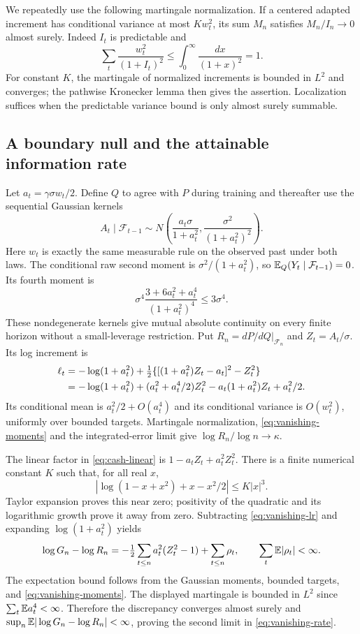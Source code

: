 We repeatedly use the following martingale normalization. If a centered
adapted increment has conditional variance at most $K w_t^2$, its sum
$M_n$ satisfies $M_n/I_n\to0$ almost surely. Indeed $I_t$ is predictable and
\[
 \sum_t\frac{w_t^2}{(1+I_t)^2}
 \le\int_0^\infty\frac{dx}{(1+x)^2}=1.
\]
For constant $K$, the martingale of normalized increments is bounded in
$L^2$ and converges; the pathwise Kronecker
lemma then gives the assertion. Localization suffices when the predictable
variance bound is only almost surely summable.

\subsection{A boundary null and the attainable information rate}
Let $a_t=\gamma\sigma w_t/2$. Define $Q$ to agree with $P$ during training
and thereafter use the sequential Gaussian kernels
\begin{equation}
 A_t\mid\mathcal F_{t-1}\sim
 N\!\left(\frac{a_t\sigma}{1+a_t^2},
           \frac{\sigma^2}{(1+a_t^2)^2}\right).
 \label{eq:vanishing-null}
\end{equation}
Here $w_t$ is exactly the same measurable rule on the observed past under
both laws. The conditional raw second moment is $\sigma^2/(1+a_t^2)$,
so $\mathbb E_Q(Y_t\mid\mathcal F_{t-1})=0$. Its fourth moment is
\[
 \sigma^4\frac{3+6a_t^2+a_t^4}{(1+a_t^2)^4}\le3\sigma^4.
\]
These nondegenerate kernels give mutual absolute continuity on every finite
horizon without a small-leverage restriction. Put $R_n=dP/dQ|_{\mathcal F_n}$
and $Z_t=A_t/\sigma$. Its log increment is
\begin{align}
 \ell_t&=-\log(1+a_t^2)
  +\tfrac12\{[(1+a_t^2)Z_t-a_t]^2-Z_t^2\}\notag\\
 &=-\log(1+a_t^2)+(a_t^2+a_t^4/2)Z_t^2
          -a_t(1+a_t^2)Z_t+a_t^2/2.
 \label{eq:vanishing-lr}
\end{align}
Its conditional mean is $a_t^2/2+O(a_t^4)$ and its conditional variance is
$O(w_t^2)$, uniformly over bounded targets. Martingale normalization,
\eqref{eq:vanishing-moments} and the integrated-error limit give
$\log R_n/\log n\to\kappa$.

The linear factor in \eqref{eq:cash-linear} is $1-a_tZ_t+a_t^2Z_t^2$.
There is a finite numerical constant $K$ such that, for all real $x$,
\[
 |\log(1-x+x^2)+x-x^2/2|\le K|x|^3.
\]
Taylor expansion proves this near zero; positivity of the quadratic and its
logarithmic growth prove it away from zero. Subtracting
\eqref{eq:vanishing-lr} and expanding $\log(1+a_t^2)$ yields
\begin{equation}
 \log G_n-\log R_n
   =-\tfrac12\sum_{t\le n}a_t^2(Z_t^2-1)+\sum_{t\le n}\rho_t,
 \qquad \sum_t\mathbb E|\rho_t|<\infty.
 \label{eq:vanishing-remainder}
\end{equation}
The expectation bound follows from the Gaussian moments, bounded targets,
and \eqref{eq:vanishing-moments}. The displayed martingale is bounded in
$L^2$ since $\sum_t\mathbb E a_t^4<\infty$. Therefore the discrepancy converges
almost surely and $\sup_n\mathbb E|\log G_n-\log R_n|<\infty$, proving the second
limit in \eqref{eq:vanishing-rate}.

